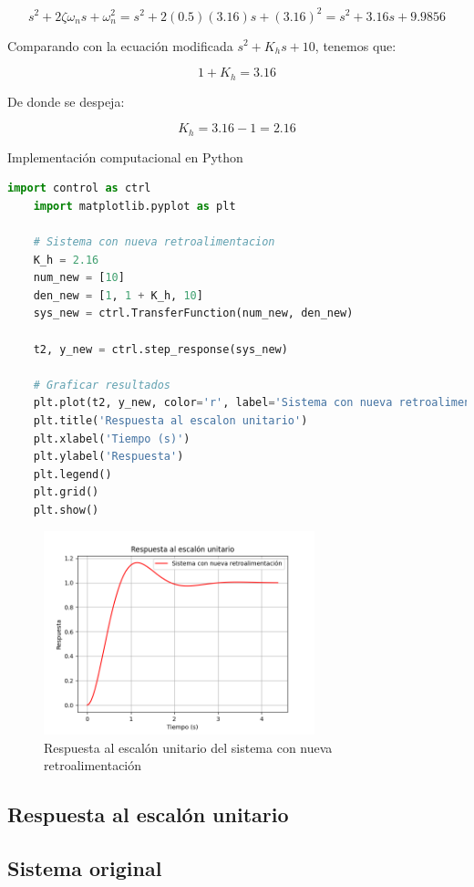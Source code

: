 \documentclass[10pt]{article}
\theoremstyle{definition}
\theoremstyle{remark}
\theoremstyle{definition}
\numberwithin{equation}{prob}
\begin{document}
\[
s^2 + 2\zeta \omega_n s + \omega_n^2 = s^2 + 2(0.5)(3.16)s + (3.16)^2 = s^2 + 3.16s + 9.9856
\]

Comparando con la ecuación modificada \(s^2 + K_hs + 10\), tenemos que:

\[
1 + K_h = 3.16
\]

De donde se despeja:

\[
K_h = {3.16 - 1} = 2.16
\]

Implementación computacional en Python
\begin{lstlisting}[language=Python]
	import control as ctrl
	import matplotlib.pyplot as plt

	# Sistema con nueva retroalimentacion
	K_h = 2.16
	num_new = [10]
	den_new = [1, 1 + K_h, 10]
	sys_new = ctrl.TransferFunction(num_new, den_new)

	t2, y_new = ctrl.step_response(sys_new)

	# Graficar resultados
	plt.plot(t2, y_new, color='r', label='Sistema con nueva retroalimentacion')
	plt.title('Respuesta al escalon unitario')
	plt.xlabel('Tiempo (s)')
	plt.ylabel('Respuesta')
	plt.legend()
	plt.grid()
	plt.show()
\end{lstlisting}

\begin{figure}[h]
	\centering
	\includegraphics[width=0.7\textwidth]{./figures/Figura 5 ejercicio 5.png}
	\caption{Respuesta al escalón unitario del sistema con nueva retroalimentación}
\end{figure}

\newpage

\subsection{Respuesta al escalón unitario}

\subsection*{Sistema original}
\end{document}
